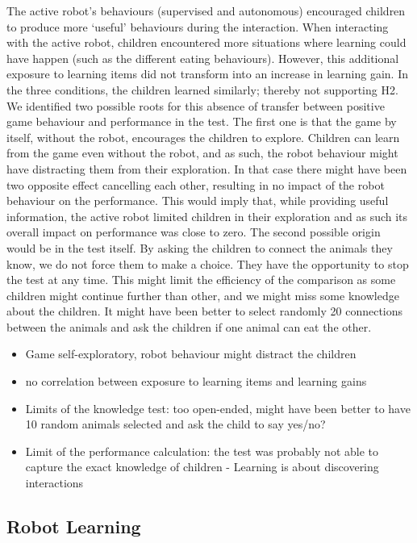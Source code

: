 The active robot's behaviours (supervised and autonomous) encouraged children to produce more `useful' behaviours during the interaction. When interacting with the active robot, children encountered more situations where learning could have happen (such as the different eating behaviours). However, this additional exposure to learning items did not transform into an increase in learning gain. In the three conditions, the children learned similarly; thereby not supporting H2. We identified two possible roots for this absence of transfer between positive game behaviour and performance in the test. The first one is that the game by itself, without the robot, encourages the children to explore. Children can learn from the game even without the robot, and as such, the robot behaviour might have distracting them from their exploration. In that case there might have been two opposite effect cancelling each other, resulting in no impact of the robot behaviour on the performance. This would imply that, while providing useful information, the active robot limited children in their exploration and as such its overall impact on performance was close to zero. The second possible origin would be in the test itself. By asking the children to connect the animals they know, we do not force them to make a choice. They have the opportunity to stop the test at any time. This might limit the efficiency of the comparison as some children might continue further than other, and we might miss some knowledge about the children. It might have been better to select randomly 20 connections between the animals and ask the children if one animal can eat the other.

\begin{itemize}
	\item Game self-exploratory, robot behaviour might distract the children
	\item no correlation between exposure to learning items and learning gains
	\item Limits of the knowledge test: too open-ended, might have been better to have 10 random animals selected and ask the child to say yes/no?
	\item Limit of the performance calculation: the test was probably not able to capture the exact knowledge of children - Learning is about discovering interactions
\end{itemize}

\subsection{Robot Learning}

